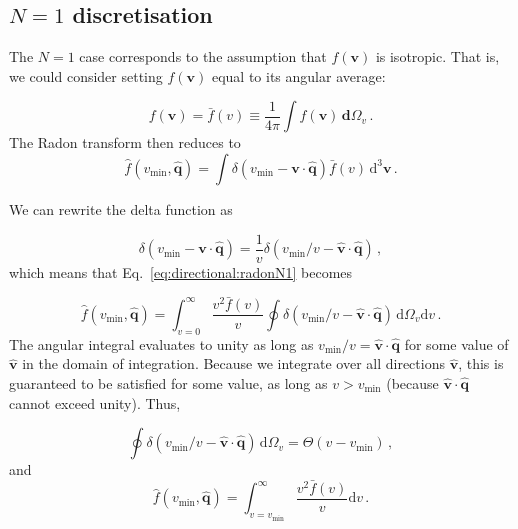 
\subsection{$N=1$ discretisation}

The $N=1$ case corresponds to the assumption that $f(\textbf{v})$ is isotropic. That is, we could consider setting $f(\textbf{v})$ equal to its angular average:  

\begin{equation}
\label{eq:directional:isotropic}
f(\textbf{v}) = \bar{f}(v) \equiv \frac{1}{4\pi} \int f(\textbf{v}) \, \mathbf{d}\Omega_v\,.
\end{equation}
The Radon transform then reduces to
\begin{equation}
\label{eq:directional:radonN1}
\hat{f}\left(v_\textrm{min},\hat{\textbf{q}}\right) = \int \delta\left(v_\textrm{min} - \textbf{v}\cdot\hat{\textbf{q}}\right) \bar{f}(v) \,\textrm{d}^3\textbf{v}\,.
\end{equation}

We can rewrite the delta function as

\begin{equation}
\delta\left(v_\textrm{min} - \textbf{v}\cdot\hat{\textbf{q}}\right) = \frac{1}{v}\delta(v_\textrm{min}/v - \hat{\textbf{v}}\cdot\hat{\textbf{q}})\,, 
\end{equation}
which means that Eq.~\ref{eq:directional:radonN1} becomes  

\begin{equation}
\hat{f}\left(v_\textrm{min},\hat{\textbf{q}}\right) = \int_{v=0}^\infty \frac{v^2\bar{f}(v)}{v} \oint \delta\left(v_\textrm{min}/v - \hat{\textbf{v}}\cdot\hat{\textbf{q}}\right)  \, \mathrm{d}\Omega_v\mathrm{d}v\,.
\end{equation}
The angular integral evaluates to unity as long as $v_\textrm{min}/v = \hat{\textbf{v}}\cdot\hat{\textbf{q}}$ for some value of $\hat{\textbf{v}}$ in the domain of integration. Because we integrate over all directions $\hat{\textbf{v}}$, this is guaranteed to be satisfied for some value, as long as $v > v_\textrm{min}$ (because $\hat{\textbf{v}}\cdot\hat{\textbf{q}}$ cannot exceed unity). Thus,

\begin{equation}
\oint \delta\left(v_\textrm{min}/v - \hat{\textbf{v}}\cdot\hat{\textbf{q}}\right)  \, \mathrm{d}\Omega_v = \Theta(v - v_\textrm{min})\,,
\end{equation}
and
\begin{equation}
\hat{f}\left(v_\textrm{min},\hat{\textbf{q}}\right) = \int_{v=v_\textrm{min}}^\infty \frac{v^2\bar{f}(v)}{v} \mathrm{d}v\,.
\end{equation}


